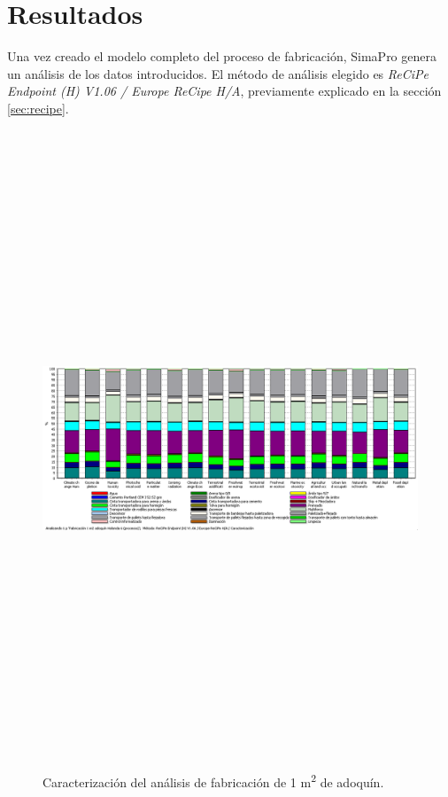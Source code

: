 \section{Resultados}

Una vez creado el modelo completo del proceso de fabricación, SimaPro genera un análisis de los datos introducidos. El método de análisis elegido es \textit{ReCiPe Endpoint (H) V1.06 / Europe ReCipe H/A}, previamente explicado en la sección \ref{sec:recipe}.

\begin{figure}[!htb]
\centering
\includegraphics[angle=90,height=19cm]{fabricacion_caracterizacion.png}
\caption{Caracterización del análisis de fabricación de 1 \si{m^2} de adoquín.}
\label{fig:caracterizacionfabricacion}
\end{figure}

